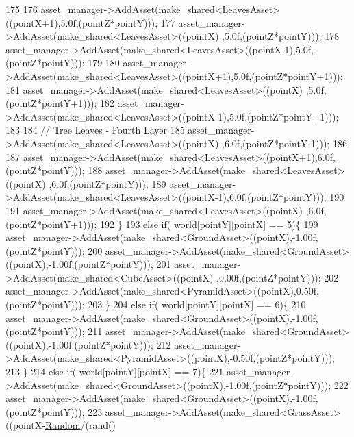 \begin{DoxyCode}
175 
176             asset\_manager->AddAsset(make\_shared<LeavesAsset>((pointX+1),5.0f,(pointZ*pointY)));
177             asset\_manager->AddAsset(make\_shared<LeavesAsset>((pointX)  ,5.0f,(pointZ*pointY)));
178             asset\_manager->AddAsset(make\_shared<LeavesAsset>((pointX-1),5.0f,(pointZ*pointY)));
179  
180             asset\_manager->AddAsset(make\_shared<LeavesAsset>((pointX+1),5.0f,(pointZ*pointY+1)));
181             asset\_manager->AddAsset(make\_shared<LeavesAsset>((pointX)  ,5.0f,(pointZ*pointY+1)));
182             asset\_manager->AddAsset(make\_shared<LeavesAsset>((pointX-1),5.0f,(pointZ*pointY+1)));
183 
184             \textcolor{comment}{// Tree Leaves - Fourth Layer}
185             asset\_manager->AddAsset(make\_shared<LeavesAsset>((pointX)  ,6.0f,(pointZ*pointY-1)));
186 
187             asset\_manager->AddAsset(make\_shared<LeavesAsset>((pointX+1),6.0f,(pointZ*pointY)));
188             asset\_manager->AddAsset(make\_shared<LeavesAsset>((pointX)  ,6.0f,(pointZ*pointY)));
189             asset\_manager->AddAsset(make\_shared<LeavesAsset>((pointX-1),6.0f,(pointZ*pointY)));
190 
191             asset\_manager->AddAsset(make\_shared<LeavesAsset>((pointX)  ,6.0f,(pointZ*pointY+1)));
192    \}
193     \textcolor{keywordflow}{else} \textcolor{keywordflow}{if}( world[pointY][pointX] == 5)\{
199             asset\_manager->AddAsset(make\_shared<GroundAsset>((pointX),-1.00f,(pointZ*pointY)));
200             asset\_manager->AddAsset(make\_shared<GroundAsset>((pointX),-1.00f,(pointZ*pointY)));
201             asset\_manager->AddAsset(make\_shared<CubeAsset>((pointX)  ,0.00f,(pointZ*pointY)));
202             asset\_manager->AddAsset(make\_shared<PyramidAsset>((pointX),0.50f,(pointZ*pointY)));
203    \}
204     \textcolor{keywordflow}{else} \textcolor{keywordflow}{if}( world[pointY][pointX] == 6)\{
210             asset\_manager->AddAsset(make\_shared<GroundAsset>((pointX),-1.00f,(pointZ*pointY)));
211             asset\_manager->AddAsset(make\_shared<GroundAsset>((pointX),-1.00f,(pointZ*pointY)));
212             asset\_manager->AddAsset(make\_shared<PyramidAsset>((pointX),-0.50f,(pointZ*pointY)));
213    \}
214     \textcolor{keywordflow}{else} \textcolor{keywordflow}{if}( world[pointY][pointX] == 7)\{
221             asset\_manager->AddAsset(make\_shared<GroundAsset>((pointX),-1.00f,(pointZ*pointY)));
222             asset\_manager->AddAsset(make\_shared<GroundAsset>((pointX),-1.00f,(pointZ*pointY)));
223             asset\_manager->AddAsset(make\_shared<GrassAsset>((pointX-\hyperlink{classGameWorld_a56652cc9880b3ba1be61395066c863c3}{Random}/(rand() %

\end{DoxyCode}

